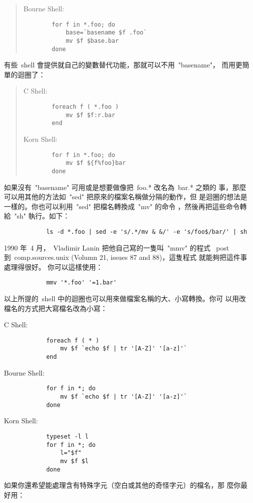 \documentclass{article}
\begin{document}
\begin{CJK*}{Bg5}{ming}
\begin{quote}
	Bourne Shell:
\begin{verbatim}
		for f in *.foo; do
		    base=`basename $f .foo`
		    mv $f $base.bar
		done
\end{verbatim}
\end{quote}
	有些~shell 會提供就自己的變數替代功能，那就可以不用~"basename"，
	而用更簡單的迴圈了：
\begin{quote}
	C Shell:
\begin{verbatim}
		foreach f ( *.foo )
		    mv $f $f:r.bar
		end
\end{verbatim}

	Korn Shell:
\begin{verbatim}
		for f in *.foo; do
		    mv $f ${f%foo}bar
		done
\end{verbatim}
\end{quote}
	如果沒有~"basename" 可用或是想要做像把~foo.* 改名為~bar.* 之類的
	事，那麼可以用其他的方法如~"sed" 把原來的檔案名稱做分隔的動作，但
	是迴圈的想法是一樣的。你也可以利用~"sed" 把檔名轉換成~"mv" 的命令
	，然後再把這些命令轉給~"sh" 執行。如下：
\begin{verbatim}
	        ls -d *.foo | sed -e 's/.*/mv & &/' -e 's/foo$/bar/' | sh
\end{verbatim}
	1990 年~4 月，~Vladimir Lanin 把他自己寫的一隻叫~"mmv" 的程式
	~post 到~comp.sources.unix (Volumn 21, issues 87 and 88)，這隻程式
	就能夠把這件事處理得很好。 你可以這樣使用：
\begin{verbatim}
        	mmv '*.foo' '=1.bar'
\end{verbatim}
	以上所提的~shell 中的迴圈也可以用來做檔案名稱的大、小寫轉換。你可
	以用改檔名的方式把大寫檔名改為小寫：

        C Shell:
\begin{verbatim}
            foreach f ( * )
                mv $f `echo $f | tr '[A-Z]' '[a-z]'`
            end
\end{verbatim}

        Bourne Shell:
\begin{verbatim}
            for f in *; do
                mv $f `echo $f | tr '[A-Z]' '[a-z]'`
            done
\end{verbatim}

        Korn Shell:
\begin{verbatim}
            typeset -l l
            for f in *; do
                l="$f"
                mv $f $l
            done
\end{verbatim}
	如果你還希望能處理含有特殊字元（空白或其他的奇怪字元）的檔名，那
	麼你最好用：


\end{CJK*}
\end{document}
